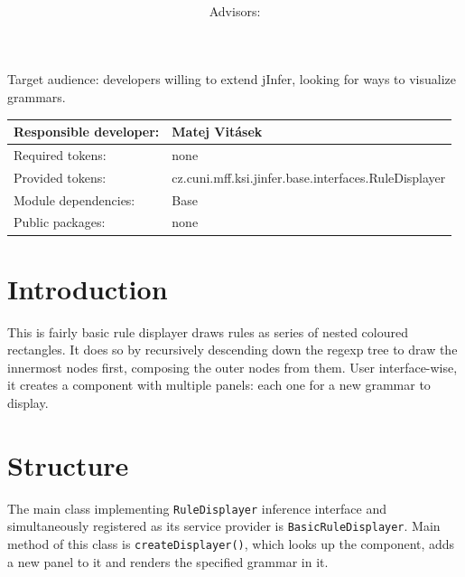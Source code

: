 \documentclass[a4paper,10pt,oneside]{article}
\title{\bf\mftitle}
\author{\mfauthor \\ Advisors: \mfadvisor}
\date{\mfplacedate}
\newcommand{\code}[1]{\texttt{#1}}
\begin{document}
\maketitle
\noindent Target audience: developers willing to extend jInfer, looking for ways to visualize grammars.

\noindent \begin{tabular}{|l|l|} \hline
Responsible developer: & Matej Vitásek \\ \hline
Required tokens:       & none \\ \hline
Provided tokens:       & cz.cuni.mff.ksi.jinfer.base.interfaces.RuleDisplayer \\ \hline
Module dependencies:   & Base \\ \hline
Public packages:       & none \\ \hline
\end{tabular}

\section{Introduction}

This is fairly basic rule displayer draws rules as series of nested coloured rectangles. It does so by recursively descending down the regexp tree to draw the innermost nodes first, composing the outer nodes from them. User interface-wise, it creates a component with multiple panels: each one for a new grammar to display.

\section{Structure}

The main class implementing \code{RuleDisplayer} inference interface and simultaneously registered as its service provider is \code{BasicRuleDisplayer}. Main method of this class is \code{createDisplayer()}, which looks up the component, adds a new panel to it and renders the specified grammar in it.\\
\end{document}
